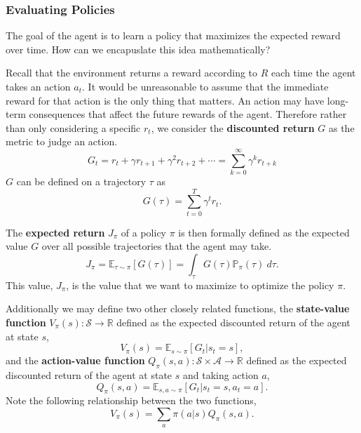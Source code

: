 \documentclass[12pt]{report}
\theoremstyle{definition}
\theoremstyle{remark}
\begin{document}
\subsubsection{Evaluating Policies}
The goal of the agent is to learn a policy that maximizes the expected reward over time. How can we encapuslate this idea mathematically?

Recall that the environment returns a reward according to $R$ each time the agent takes an action $a_t$. It would be unreasonable to assume that the immediate reward for that action is the only thing that matters. An action may have long-term consequences that affect the future rewards of the agent. Therefore rather than only considering a specific $r_t$, we consider the \textbf{discounted return} $G$ as the metric to judge an action.
\begin{equation}
    G_t = r_t + \gamma r_{t+1} + \gamma^2 r_{t+2} + \cdots = \sum_{k=0}^{\infty} \gamma^k r_{t+k}
\end{equation}
$G$ can be defined on a trajectory $\tau$ as
\begin{equation}
    G(\tau) = \sum_{t=0}^{T} \gamma^t r_t.
\end{equation}

The \textbf{expected return} $J_\pi$ of a policy $\pi$ is then formally defined as the expected value $G$ over all possible trajectories that the agent may take.
\begin{equation}\label{eq:expected-return}
    J_\pi = \mathbb{E}_{\tau\sim\pi}[G(\tau)] = \int_{\tau} G(\tau)\mathbb{P}_\pi(\tau)\ d\tau.
\end{equation}
This value, $J_\pi$, is the value that we want to maximize to optimize the policy $\pi$.

Additionally we may define two other closely related functions, the \textbf{state-value function} $V_\pi(s): \mathcal{S} \to \mathbb{R}$ defined as the expected discounted return of the agent at state $s$,
\begin{equation}
    V_\pi(s) = \mathbb{E}_{s\sim\pi}[G_t | s_t = s],
\end{equation}
and the \textbf{action-value function} $Q_\pi(s, a): \mathcal{S} \times \mathcal{A} \to \mathbb{R}$ defined as the expected discounted return of the agent at state $s$ and taking action $a$,
\begin{equation}
    Q_\pi(s, a) = \mathbb{E}_{s, a\sim\pi}[G_t | s_t = s, a_t = a].
\end{equation}
Note the following relationship between the two functions,
\begin{equation}
    V_\pi(s) = \sum_a \pi(a | s) Q_\pi(s, a).
\end{equation}
\end{document}
